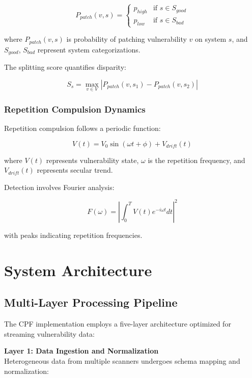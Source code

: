 \documentclass[11pt,a4paper]{article}
\begin{document}
\begin{equation}
P_{patch}(v, s) = \begin{cases}
p_{high} & \text{if } s \in S_{good} \\
p_{low} & \text{if } s \in S_{bad}
\end{cases}
\end{equation}

where $P_{patch}(v, s)$ is probability of patching vulnerability $v$ on system $s$, and $S_{good}$, $S_{bad}$ represent system categorizations.

The splitting score quantifies disparity:

\begin{equation}
S_s = \max_{v \in V} \left| P_{patch}(v, s_1) - P_{patch}(v, s_2) \right|
\end{equation}

\subsubsection{Repetition Compulsion Dynamics}

Repetition compulsion follows a periodic function:

\begin{equation}
V(t) = V_0 \sin(\omega t + \phi) + V_{drift}(t)
\end{equation}

where $V(t)$ represents vulnerability state, $\omega$ is the repetition frequency, and $V_{drift}(t)$ represents secular trend.

Detection involves Fourier analysis:

\begin{equation}
F(\omega) = \left| \int_{0}^{T} V(t) e^{-i\omega t} dt \right|^2
\end{equation}

with peaks indicating repetition frequencies.

\section{System Architecture}

\subsection{Multi-Layer Processing Pipeline}

The CPF implementation employs a five-layer architecture optimized for streaming vulnerability data:

\textbf{Layer 1: Data Ingestion and Normalization}\\
Heterogeneous data from multiple scanners undergoes schema mapping and normalization:
\end{document}
